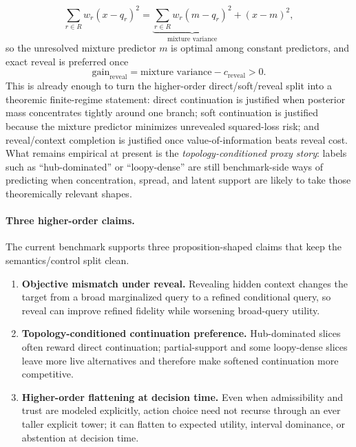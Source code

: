 \documentclass[11pt,openany]{report}
\begin{document}
\[
  \sum_{r \in R} w_r (x - q_r)^2
  = \underbrace{\sum_{r \in R} w_r (m - q_r)^2}_{\text{mixture variance}}
    + (x - m)^2,
\]
so the unresolved mixture predictor $m$ is optimal among constant
predictors, and exact reveal is preferred once
\[
  \text{gain}_{\mathrm{reveal}}
  = \text{mixture variance} - c_{\mathrm{reveal}} > 0.
\]
This is already enough to turn the higher-order direct/soft/reveal split
into a theoremic finite-regime statement: direct continuation is
justified when posterior mass concentrates tightly around one branch;
soft continuation is justified because the mixture predictor minimizes
unrevealed squared-loss risk; and reveal/context completion is justified
once value-of-information beats reveal cost.  What remains empirical at
present is the \emph{topology-conditioned proxy story}: labels such as
``hub-dominated'' or ``loopy-dense'' are still benchmark-side ways of
predicting when concentration, spread, and latent support are likely to
take those theoremically relevant shapes.

\paragraph{Three higher-order claims.}
The current benchmark supports three proposition-shaped claims that keep
the semantics/control split clean.
\begin{enumerate}
\item \textbf{Objective mismatch under reveal.} Revealing hidden context
  changes the target from a broad marginalized query to a refined
  conditional query, so reveal can improve refined fidelity while
  worsening broad-query utility.
\item \textbf{Topology-conditioned continuation preference.}
  Hub-dominated slices often reward direct continuation; partial-support
  and some loopy-dense slices leave more live alternatives and therefore
  make softened continuation more competitive.
\item \textbf{Higher-order flattening at decision time.} Even when
  admissibility and trust are modeled explicitly, action choice need not
  recurse through an ever taller explicit tower; it can flatten to
  expected utility, interval dominance, or abstention at decision time.
\end{enumerate}
\end{document}
